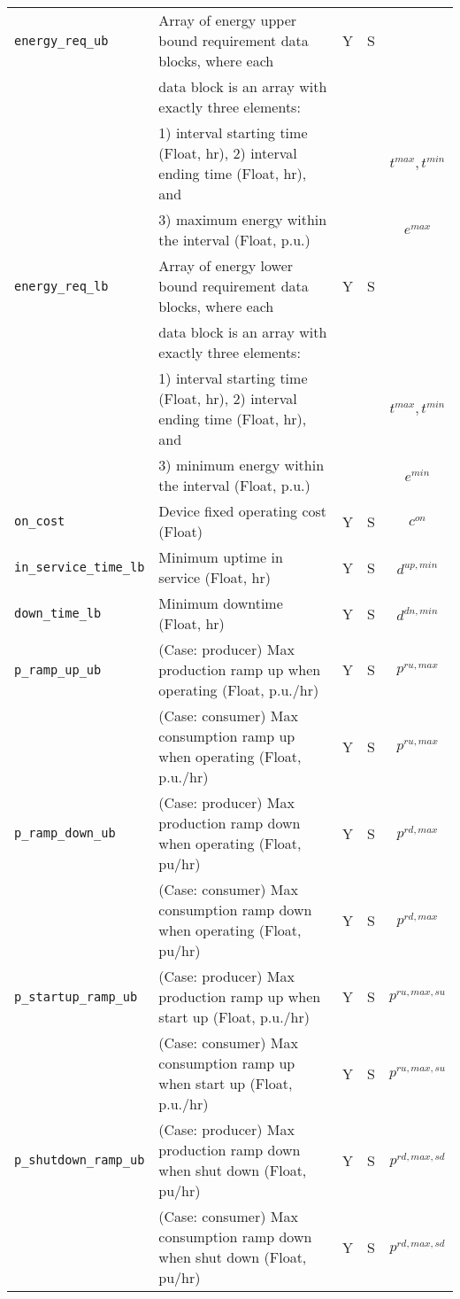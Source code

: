 \documentclass{article}
\begin{document}
\begin{center}
\begin{tabular}{ l | l | c | c | c |}
  {\tt energy\_req\_ub} & Array of energy upper bound requirement data blocks, where each & Y & S & \\
                        & data block is an array with exactly three elements: &   &   & \\
                        & 1) interval starting time (Float, hr), 2) interval ending time (Float, hr), and &   &   & { $t^{max}, t^{min}$}\\
                        & 3) maximum energy within the interval (Float, p.u.) &   &   & { $e^{max}$ }\\
  {\tt energy\_req\_lb} & Array of energy lower bound requirement data blocks, where each & Y & S &  \\
                        & data block is an array with exactly three elements: &   &   & \\
                        & 1) interval starting time (Float, hr), 2) interval ending time (Float, hr), and &   &   & { $t^{max}, t^{min}$}\\
                        & 3) minimum energy within the interval (Float, p.u.)  &   &   & { $e^{min}$}\\                               
  {\tt on\_cost} & Device fixed operating cost (Float) & Y & S & $c^{on}$\\
  {\tt in\_service\_time\_lb} & Minimum uptime in service (Float, hr) & Y & S & $d^{up,min}$\\
  {\tt down\_time\_lb} & Minimum downtime (Float, hr) & Y & S & $d^{dn,min}$\\
  {\tt p\_ramp\_up\_ub}     & {(Case: producer) Max production ramp up when operating (Float, p.u./hr)} & Y & S & $p^{ru,max}$ \\
                            & {(Case: consumer) Max consumption ramp up when operating (Float, p.u./hr)} & Y & S & $p^{ru,max}$ \\
  {\tt p\_ramp\_down\_ub}   & {(Case: producer) Max production ramp down when operating (Float, pu/hr)} & Y & S & $p^{rd,max}$ \\
                            & {(Case: consumer) Max consumption ramp down when operating (Float, pu/hr)} & Y & S & $p^{rd,max}$ \\
  {\tt p\_startup\_ramp\_ub} & {(Case: producer) Max production ramp up when start up (Float, p.u./hr)} & Y & S & $p^{ru,max,su}$\\
                             & {(Case: consumer) Max consumption ramp up when start up (Float, p.u./hr)} & Y & S & $p^{ru,max,su}$\\
  {\tt p\_shutdown\_ramp\_ub}& {(Case: producer) Max production ramp down when shut down (Float, pu/hr)} & Y & S & $p^{rd,max,sd}$\\
                             & {(Case: consumer) Max consumption ramp down when shut down (Float, pu/hr)} & Y & S & $p^{rd,max,sd}$\\


\end{tabular}
\end{center}
\end{document}
